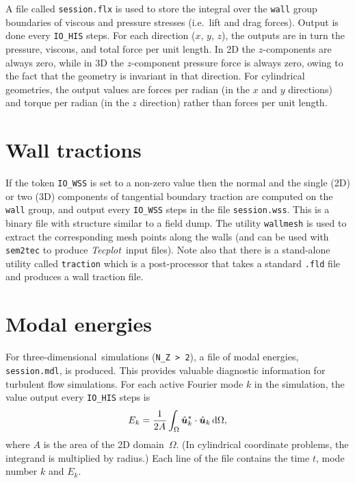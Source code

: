 \documentclass[11pt]{report}
\newcommand{\Tecplot}{\emph{Tecplot}}
\newcommand\threed{three-di\-men\-sion\-al}
\begin{document}
A file called \verb+session.flx+ is used to store the integral over
the \verb+wall+ group boundaries of viscous and pressure stresses
(i.e.\ lift and drag forces).  Output is done every \verb+IO_HIS+
steps.  For each direction ($x$, $y$, $z$), the outputs are in turn
the pressure, viscous, and total force per unit length.  In 2D the
$z$-components are always zero, while in 3D the $z$-component pressure
force is always zero, owing to the fact that the geometry is invariant
in that direction.  For cylindrical geometries, the output values are
forces per radian (in the $x$ and $y$ directions) and torque per
radian (in the $z$ direction) rather than forces per unit length.

\section{Wall tractions}
\label{sec.traction}

If the token \verb+IO_WSS+ is set to a non-zero value then the normal
and the single (2D) or two (3D) components of tangential boundary
traction are computed on the \verb+wall+ group, and output every
\verb+IO_WSS+ steps in the file \verb+session.wss+.  This is a binary
file with structure similar to a field dump.  The utility
\verb+wallmesh+ is used to extract the corresponding mesh points along
the walls (and can be used with \verb|sem2tec| to produce
\Tecplot\ input files). Note also that there is a stand-alone utility
called \verb+traction+ which is a post-processor that takes a standard
\verb|.fld| file and produces a wall traction file.

\section{Modal energies}
\label{sec.modal}

For \threed\ simulations (\verb+N_Z > 2+), a file of modal energies,
\verb+session.mdl+, is produced.  This provides valuable diagnostic
information for turbulent flow simulations.  For each active Fourier
mode $k$ in the simulation, the value output every \verb+IO_HIS+ steps
is 
\[
E_k =
\frac{1}{2A}\int_\Omega
\hat{\bm{u}}_k^\ast\cdot\hat{\bm{u}}_k \,{\rm d}\Omega,
\]
where $A$ is the area of the 2D domain~$\Omega$.  (In cylindrical
coordinate problems, the integrand is multiplied by radius.) Each line
of the file contains the time $t$, mode number $k$ and $E_k$.
\end{document}
